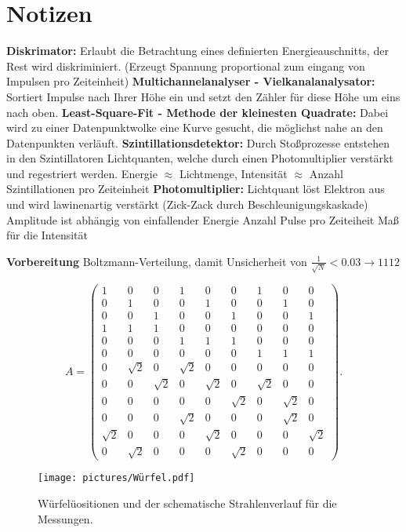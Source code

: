 \section{Notizen}
\textbf{Diskrimator:} Erlaubt die Betrachtung eines definierten Energieauschnitts, der Rest wird diskriminiert. (Erzeugt Spannung proportional zum eingang von Impulsen pro Zeiteinheit)
\textbf{Multichannelanalyser - Vielkanalanalysator:} Sortiert Impulse nach Ihrer Höhe ein und setzt den Zähler für diese Höhe um eins nach oben.
\textbf{Least-Square-Fit - Methode der kleinesten Quadrate:} Dabei wird zu einer Datenpunktwolke eine Kurve gesucht, die möglichst nahe an den Datenpunkten verläuft.
\textbf{Szintillationsdetektor:} Durch Stoßprozesse entstehen in den Szintillatoren Lichtquanten, welche durch einen Photomultiplier verstärkt und regestriert werden. Energie $\approx$ Lichtmenge, Intensität $\approx$ Anzahl Szintillationen pro Zeiteinheit 
\textbf{Photomultiplier:} Lichtquant löst Elektron aus und wird lawinenartig verstärkt (Zick-Zack durch Beschleunigungskaskade) Amplitude ist abhängig von einfallender Energie
Anzahl Pulse pro Zeiteiheit Maß für die Intensität

\textbf{Vorbereitung}
Boltzmann-Verteilung, damit Unsicherheit von $\frac{1}{\sqrt{N}} < \num{0.03} \rightarrow \num{1112}$ 

 \begin{equation*}
   A = \begin{pmatrix}
              1 & 0 & 0 & 1 & 0 & 0 & 1 & 0 & 0 \\
              0 & 1 & 0 & 0 & 1 & 0 & 0 & 1 & 0 \\
              0 & 0 & 1 & 0 & 0 & 1 & 0 & 0 & 1 \\
              1 & 1 & 1 & 0 & 0 & 0 & 0 & 0 & 0 \\
              0 & 0 & 0 & 1 & 1 & 1 & 0 & 0 & 0 \\
              0 & 0 & 0 & 0 & 0 & 0 & 1 & 1 & 1 \\
              0 & \sqrt{2} & 0 & \sqrt{2} & 0 & 0 & 0 & 0 & 0 \\
              0 & 0 & \sqrt{2} & 0 & \sqrt{2} & 0 & \sqrt{2} & 0 & 0 \\
              0 & 0 & 0 & 0 & 0 & \sqrt{2} & 0 & \sqrt{2} & 0 \\
              0 & 0 & 0 & \sqrt{2} & 0 & 0 & 0 & \sqrt{2} & 0 \\
              \sqrt{2} & 0 & 0 & 0 & \sqrt{2} & 0 & 0 & 0 & \sqrt{2} \\
              0 & \sqrt{2} & 0 & 0 & 0 & \sqrt{2} & 0 & 0 & 0
      \end{pmatrix}.
      \label{eqn:matrix}
 \end{equation*}

\begin{figure}[htb]
  \centering
  \texttt{[image: pictures/Würfel.pdf]}
  \caption{Würfelüositionen und der schematische Strahlenverlauf für die Messungen.}
  \label{fig:Pos}
\end{figure}